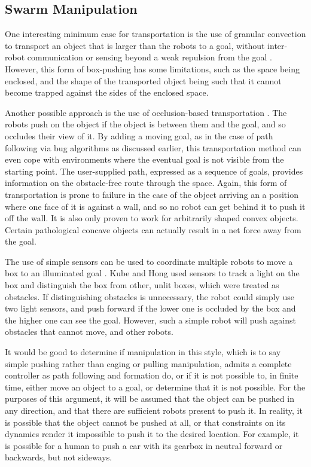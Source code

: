 \subsection{Swarm Manipulation}

One interesting minimum case for transportation is the use of granular convection to transport an object that is larger than the robots to a goal, without inter-robot communication or sensing beyond a weak repulsion from the goal \citep{sugawara2014object}. 
However, this form of box-pushing has some limitations, such as the space being enclosed, and the shape of the transported object being such that it cannot become trapped against the sides of the enclosed space.

Another possible approach is the use of occlusion-based transportation \citep{chen2015occlusion}. 
The robots push on the object if the object is between them and the goal, and so occludes their view of it. 
By adding a moving goal, as in the case of path following via bug algorithms as discussed earlier, this transportation method can even cope with environments where the eventual goal is not visible from the starting point. 
The user-supplied path, expressed as a sequence of goals, provides information on the obstacle-free route through the space. 
Again, this form of transportation is prone to failure in the case of the object arriving an a position where one face of it is against a wall, and so no robot can get behind it to push it off the wall. 
It is also only proven to work for arbitrarily shaped convex objects. Certain pathological concave objects can actually result in a net force away from the goal. 

The use of simple sensors can be used to coordinate multiple robots to move a box to an illuminated goal \citep{kube1996use}. 
Kube and Hong used sensors to track a light on the box and distinguish the box from other, unlit boxes, which were treated as obstacles. 
If distinguishing obstacles is unnecessary, the robot could simply use two light sensors, and push forward if the lower one is occluded by the box and the higher one can see the goal. 
However, such a simple robot will push against obstacles that cannot move, and other robots. 

It would be good to determine if manipulation in this style, which is to say simple pushing rather than caging or pulling manipulation, admits a complete controller as path following and formation do, or if it is not possible to, in finite time, either move an object to a goal, or determine that it is not possible. 
For the purposes of this argument, it will be assumed that the object can be pushed in any direction, and that there are sufficient robots present to push it. 
In reality, it is possible that the object cannot be pushed at all, or that constraints on its dynamics render it impossible to push it to the desired location. 
For example, it is possible for a human to push a car with its gearbox in neutral forward or backwards, but not sideways. 

